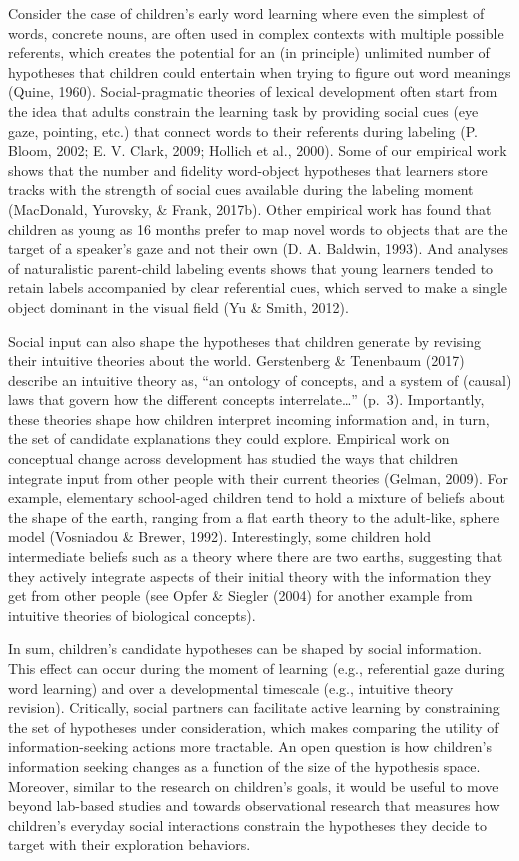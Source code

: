 \documentclass[oneside]{report}
\begin{document}
Consider the case of children's early word learning where even the
simplest of words, concrete nouns, are often used in complex contexts
with multiple possible referents, which creates the potential for an (in
principle) unlimited number of hypotheses that children could entertain
when trying to figure out word meanings (Quine, 1960). Social-pragmatic
theories of lexical development often start from the idea that adults
constrain the learning task by providing social cues (eye gaze,
pointing, etc.) that connect words to their referents during labeling
(P. Bloom, 2002; E. V. Clark, 2009; Hollich et al., 2000). Some of our
empirical work shows that the number and fidelity word-object hypotheses
that learners store tracks with the strength of social cues available
during the labeling moment (MacDonald, Yurovsky, \& Frank, 2017b). Other
empirical work has found that children as young as 16 months prefer to
map novel words to objects that are the target of a speaker's gaze and
not their own (D. A. Baldwin, 1993). And analyses of naturalistic
parent-child labeling events shows that young learners tended to retain
labels accompanied by clear referential cues, which served to make a
single object dominant in the visual field (Yu \& Smith, 2012).

Social input can also shape the hypotheses that children generate by
revising their intuitive theories about the world. Gerstenberg \&
Tenenbaum (2017) describe an intuitive theory as, ``an ontology of
concepts, and a system of (causal) laws that govern how the different
concepts interrelate\ldots{}'' (p.~3). Importantly, these theories shape
how children interpret incoming information and, in turn, the set of
candidate explanations they could explore. Empirical work on conceptual
change across development has studied the ways that children integrate
input from other people with their current theories (Gelman, 2009). For
example, elementary school-aged children tend to hold a mixture of
beliefs about the shape of the earth, ranging from a flat earth theory
to the adult-like, sphere model (Vosniadou \& Brewer, 1992).
Interestingly, some children hold intermediate beliefs such as a theory
where there are two earths, suggesting that they actively integrate
aspects of their initial theory with the information they get from other
people (see Opfer \& Siegler (2004) for another example from intuitive
theories of biological concepts).

In sum, children's candidate hypotheses can be shaped by social
information. This effect can occur during the moment of learning (e.g.,
referential gaze during word learning) and over a developmental
timescale (e.g., intuitive theory revision). Critically, social partners
can facilitate active learning by constraining the set of hypotheses
under consideration, which makes comparing the utility of
information-seeking actions more tractable. An open question is how
children's information seeking changes as a function of the size of the
hypothesis space. Moreover, similar to the research on children's goals,
it would be useful to move beyond lab-based studies and towards
observational research that measures how children's everyday social
interactions constrain the hypotheses they decide to target with their
exploration behaviors.
\end{document}
